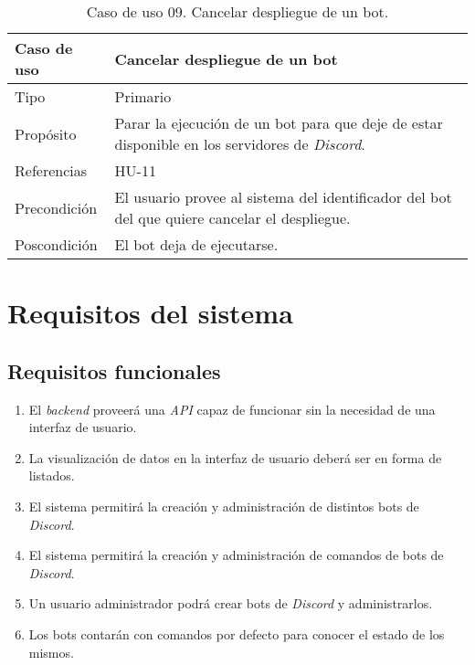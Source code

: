 \begin{table}[H]
    \centering
    \def\arraystretch{1.25}
    \begin{adjustbox}{max width=\textwidth}
    \begin{tabularx}{\textwidth}{l|L}
    \hline
        \textbf{Caso de uso} & \textbf{Cancelar despliegue de un bot} \\ \hline
    \hline
        Tipo & Primario \\ \hline
        Propósito & Parar la ejecución de un bot para que deje de estar disponible en los servidores de \textit{Discord}. \\ \hline
        Referencias & HU-11 \\ \hline
        Precondición & El usuario provee al sistema del identificador del bot del que quiere cancelar el despliegue. \\ \hline
        Poscondición & El bot deja de ejecutarse. \\ \hline
    \end{tabularx}
    \end{adjustbox}
    \caption{Caso de uso 09. Cancelar despliegue de un bot.}
\end{table}

\section{Requisitos del sistema}

\subsection{Requisitos funcionales}

\begin{enumerate}
	\item El \textit{backend} proveerá una \textit{API} capaz de funcionar sin la necesidad de una interfaz de usuario.
	\item La visualización de datos en la interfaz de usuario deberá ser en forma de listados.
	\item El sistema permitirá la creación y administración de distintos bots de \textit{Discord}.
	\item El sistema permitirá la creación y administración de comandos de bots de \textit{Discord}.
	\item Un usuario administrador podrá crear bots de \textit{Discord} y administrarlos.
	\item Los bots contarán con comandos por defecto para conocer el estado de los mismos.
\end{enumerate}

